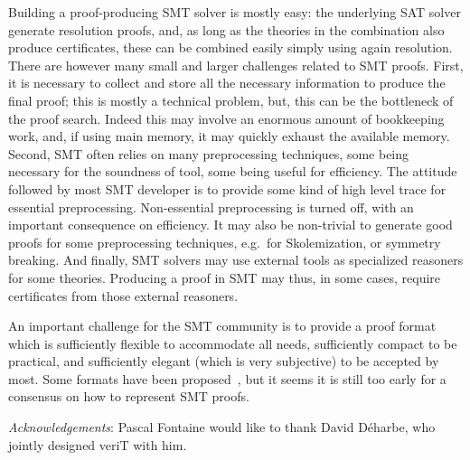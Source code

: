 \documentclass{llncs}
\begin{document}

Building a proof-producing SMT solver is mostly easy: the underlying SAT solver
generate resolution proofs, and, as long as the theories in the combination also
produce certificates, these can be combined easily simply using again
resolution.  There are however many small and larger challenges related to SMT
proofs.  First, it is necessary to collect and store all the necessary
information to produce the final proof; this is mostly a technical problem, but,
this can be the bottleneck of the proof search.  Indeed this may involve an
enormous amount of bookkeeping work, and, if using main memory, it may quickly
exhaust the available memory.  Second, SMT often relies on many preprocessing
techniques, some being necessary for the soundness of tool, some being useful
for efficiency.  The attitude followed by most SMT developer is to provide some
kind of high level trace for essential preprocessing.  Non-essential
preprocessing is turned off, with an important consequence on efficiency.  It
may also be non-trivial to generate good proofs for some preprocessing
techniques, e.g.\ for Skolemization, or symmetry breaking.  And finally, SMT
solvers may use external tools as specialized reasoners for some
theories. Producing a proof
in SMT may thus, in some cases, require certificates from those external
reasoners.

An important challenge for the SMT community is to provide a proof format which
is sufficiently flexible to accommodate all needs, sufficiently compact to be
practical, and sufficiently elegant (which is very subjective) to be accepted by
most.  Some formats have been proposed~\cite{}, but it seems it is still too early for a consensus on how to represent
SMT proofs.


\medskip
\emph{Acknowledgements}: Pascal Fontaine would like to thank David D\'{e}harbe,
who jointly designed veriT with him.




\end{document}
